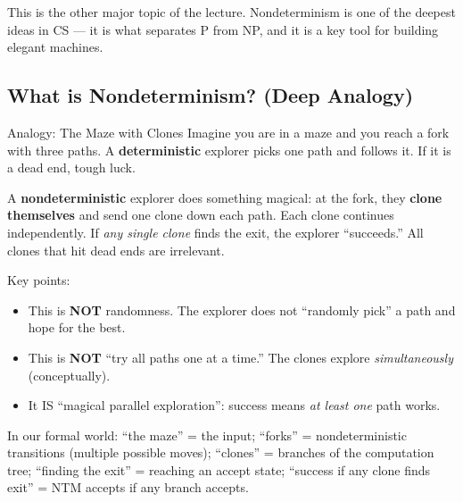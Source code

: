 \documentclass[11pt,a4paper]{article}
\begin{document}
This is the other major topic of the lecture. Nondeterminism is one of the deepest ideas in CS --- it is what separates P from NP, and it is a key tool for building elegant machines.

\subsection{What is Nondeterminism? (Deep Analogy)}

\begin{notebox}{Analogy: The Maze with Clones}
Imagine you are in a maze and you reach a fork with three paths. A \textbf{deterministic} explorer picks one path and follows it. If it is a dead end, tough luck.

A \textbf{nondeterministic} explorer does something magical: at the fork, they \textbf{clone themselves} and send one clone down each path. Each clone continues independently. If \textit{any single clone} finds the exit, the explorer ``succeeds.'' All clones that hit dead ends are irrelevant.

Key points:
\begin{itemize}[nosep]
\item This is \textbf{NOT} randomness. The explorer does not ``randomly pick'' a path and hope for the best.
\item This is \textbf{NOT} ``try all paths one at a time.'' The clones explore \textit{simultaneously} (conceptually).
\item It IS ``magical parallel exploration'': success means \textit{at least one} path works.
\end{itemize}

In our formal world: ``the maze'' = the input; ``forks'' = nondeterministic transitions (multiple possible moves); ``clones'' = branches of the computation tree; ``finding the exit'' = reaching an accept state; ``success if any clone finds exit'' = NTM accepts if any branch accepts.
\end{notebox}
\end{document}
